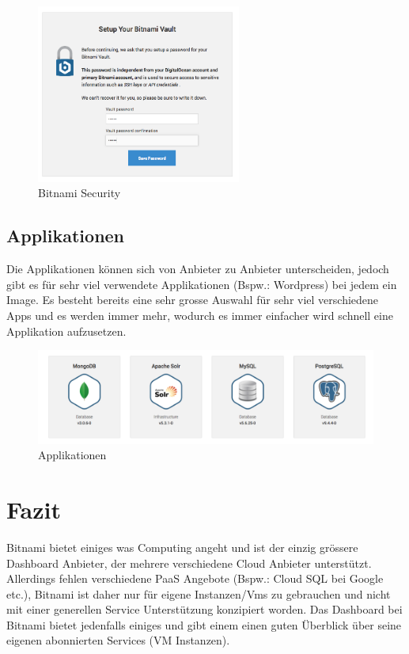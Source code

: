 \begin{figure}[!htbp]
  \centering
\includegraphics[width=0.6\textwidth]{./03_Analyse/03_Bitnami/images/bitnami_security}
\caption{Bitnami Security}
\end{figure}
\newpage

\subsection{Applikationen}
Die Applikationen können sich von Anbieter zu Anbieter unterscheiden, jedoch 
gibt es für sehr viel verwendete Applikationen (Bspw.: Wordpress) bei jedem ein 
Image.
Es besteht bereits eine sehr grosse Auswahl für sehr viel verschiedene Apps und 
es werden immer mehr, wodurch es immer einfacher wird schnell eine Applikation 
aufzusetzen.

\begin{figure}[!htbp]
\includegraphics[width=\textwidth]{./03_Analyse/03_Bitnami/images/apps}
\caption{Applikationen}
\end{figure}

\newpage 
\section{Fazit}
Bitnami bietet einiges was Computing angeht und ist der einzig grössere 
Dashboard Anbieter, der mehrere verschiedene Cloud Anbieter unterstützt.
Allerdings fehlen verschiedene PaaS Angebote (Bspw.: Cloud SQL bei Google etc.), 
Bitnami ist daher nur für eigene Instanzen/Vms zu gebrauchen und nicht mit einer 
generellen Service Unterstützung konzipiert worden.
Das Dashboard bei Bitnami bietet jedenfalls einiges und gibt einem einen guten 
Überblick über seine eigenen abonnierten Services (VM Instanzen).
